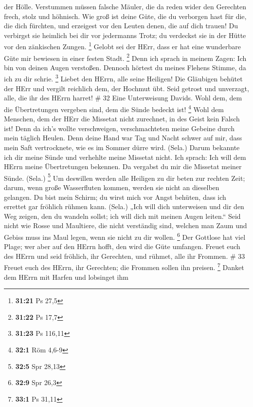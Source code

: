 der Hölle.  Verstummen müssen falsche Mäuler, die da reden
wider den Gerechten frech, stolz und höhnisch.  Wie groß
ist deine Güte, die du verborgen hast für die, die dich fürchten, und
erzeigest vor den Leuten denen, die auf dich trauen!  Du
verbirgst sie heimlich bei dir vor jedermanns Trotz; du verdeckst sie in
der Hütte vor den zänkischen Zungen. \footnote{\textbf{31:21} Ps 27,5}
 Gelobt sei der HErr, dass er hat eine wunderbare Güte mir
bewiesen in einer festen Stadt. \footnote{\textbf{31:22} Ps 17,7}
 Denn ich sprach in meinem Zagen: Ich bin von deinen Augen
verstoßen. Dennoch hörtest du meines Flehens Stimme, da ich zu dir
schrie. \footnote{\textbf{31:23} Ps 116,11}  Liebet den
HErrn, alle seine Heiligen! Die Gläubigen behütet der HErr und vergilt
reichlich dem, der Hochmut übt.  Seid getrost und
unverzagt, alle, die ihr des HErrn harret! \# 32  Eine
Unterweisung Davids. Wohl dem, dem die Übertretungen vergeben sind, dem
die Sünde bedeckt ist! \footnote{\textbf{32:1} Röm 4,6-9} 
Wohl dem Menschen, dem der HErr die Missetat nicht zurechnet, in des
Geist kein Falsch ist!  Denn da ich's wollte verschweigen,
verschmachteten meine Gebeine durch mein täglich Heulen. 
Denn deine Hand war Tag und Nacht schwer auf mir, dass mein Saft
vertrocknete, wie es im Sommer dürre wird. (Sela.)  Darum
bekannte ich dir meine Sünde und verhehlte meine Missetat nicht. Ich
sprach: Ich will dem HErrn meine Übertretungen bekennen. Da vergabst du
mir die Missetat meiner Sünde. (Sela.) \footnote{\textbf{32:5} Spr 28,13}
 Um deswillen werden alle Heiligen zu dir beten zur rechten
Zeit; darum, wenn große Wasserfluten kommen, werden sie nicht an
dieselben gelangen.  Du bist mein Schirm; du wirst mich vor
Angst behüten, dass ich errettet gar fröhlich rühmen kann. (Sela.)
 „Ich will dich unterweisen und dir den Weg zeigen, den du
wandeln sollst; ich will dich mit meinen Augen leiten.`` 
Seid nicht wie Rosse und Maultiere, die nicht verständig sind, welchen
man Zaum und Gebiss muss ins Maul legen, wenn sie nicht zu dir wollen.
\footnote{\textbf{32:9} Spr 26,3}  Der Gottlose hat viel
Plage; wer aber auf den HErrn hofft, den wird die Güte umfangen.
 Freuet euch des HErrn und seid fröhlich, ihr Gerechten,
und rühmet, alle ihr Frommen. \# 33  Freuet euch des HErrn,
ihr Gerechten; die Frommen sollen ihn preisen. \footnote{\textbf{33:1}
  Ps 31,11}  Danket dem HErrn mit Harfen und lobsinget ihm
